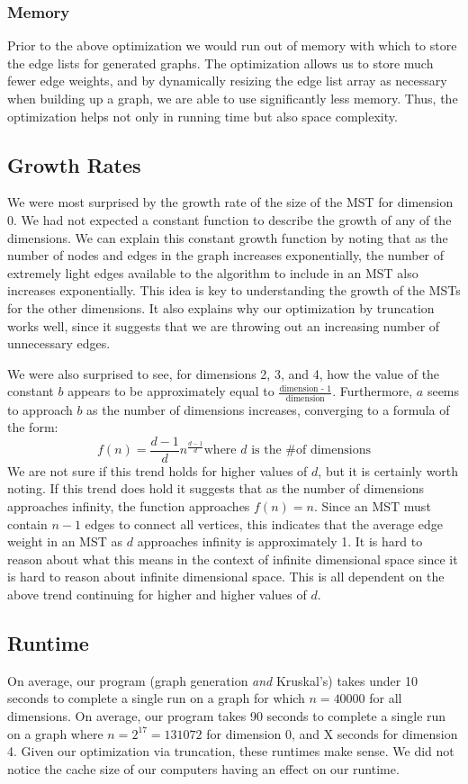 \documentclass[solution, letterpaper]{cs121}
\begin{document}
\subsubsection*{Memory}
\hspace{5mm} Prior to the above optimization we would run out of memory with which to store the edge lists for generated graphs. The optimization allows us to store much fewer edge weights, and by dynamically resizing the edge list array as necessary when building up a graph, we are able to use significantly less memory. Thus, the optimization helps not only in running time but also space complexity.

\subsection*{Growth Rates}
\hspace{5mm} We were most surprised by the growth rate of the size of the MST for dimension 0. We had not expected a constant function to describe the growth of any of the dimensions. We can explain this constant growth function by noting that as the number of nodes and edges in the graph increases exponentially, the number of extremely light edges available to the algorithm to include in an MST also increases exponentially. This idea is key to understanding the growth of the MSTs for the other dimensions. It also explains why our optimization by truncation works well, since it suggests that we are throwing out an increasing number of unnecessary edges.

We were also surprised to see, for dimensions 2, 3, and 4, how the value of the constant $b$ appears to be approximately equal to $\frac{\text{dimension - 1}}{\text{dimension}}$. Furthermore, $a$ seems to approach $b$ as the number of dimensions increases, converging to a formula of the form:
\[
f(n) = \dfrac{d-1}{d}n^{\frac{d-1}{d}} \text{where $d$ is the \# of dimensions}
\]
\hspace{5mm} We are not sure if this trend holds for higher values of $d$, but it is certainly worth noting. If this trend does hold it suggests that as the number of dimensions approaches infinity, the function approaches $f(n) = n$. Since an MST must contain $n - 1$ edges to connect all vertices, this indicates that the average edge weight in an MST as $d$ approaches infinity is approximately 1. It is hard to reason about what this means in the context of infinite dimensional space since it is hard to reason about infinite dimensional space. This is all dependent on the above trend continuing for higher and higher values of $d$.
\subsection*{Runtime}
\hspace{5mm} On average, our program (graph generation \emph{and} Kruskal's) takes under 10 seconds to complete a single run on a graph for which $n = 40000$ for all dimensions. On average, our program takes 90 seconds to complete a single run on a graph where $n = 2^{17} = 131072$ for dimension 0, and X seconds for dimension 4. Given our optimization via truncation, these runtimes make sense. We did not notice the cache size of our computers having an effect on our runtime.
\end{document}

